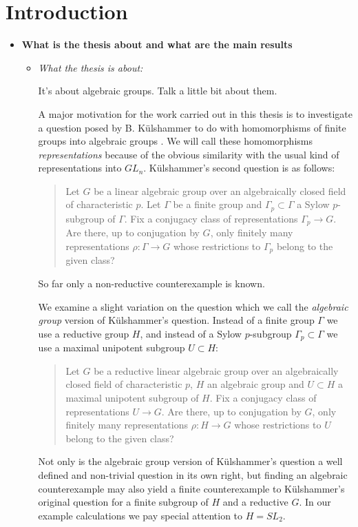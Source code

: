 
\chapter{Introduction}
\label{Chapter1}

\begin{itemize}
	\item[] \textbf{What is the thesis about and what are the main results}
	\begin{itemize}
		\item \emph{What the thesis is about:}
		
		
		It's about algebraic groups. Talk a little bit about them.
		
		A major motivation for the work carried out in this thesis is to investigate a question posed by B. K\"ulshammer to do with homomorphisms of finite groups into algebraic groups \cite{weil1964remarks}. We will call these homomorphisms \emph{representations} because of the obvious similarity with the usual kind of representations into $GL_n$. K\"ulshammer's second question is as follows:
		\begin{quote}
		Let $G$ be a linear algebraic group over an algebraically closed field of characteristic $p$. Let $\Gamma$ be a finite group and $\Gamma_p\subset\Gamma$ a Sylow $p$-subgroup of $\Gamma$. Fix a conjugacy class of representations $\Gamma_p\rightarrow G$. Are there, up to conjugation by $G$, only finitely many representations $\rho:\Gamma\rightarrow G$ whose restrictions to $\Gamma_p$ belong to the given class?
		\end{quote}
		
		
		So far only a non-reductive counterexample\cite{weil1964remarks} is known. 
		
		
		We examine a slight variation on the question which we call the \emph{algebraic group} version of K\"ulshammer's question. Instead of a finite group $\Gamma$ we use a reductive group $H$, and instead of a Sylow $p$-subgroup $\Gamma_p \subset \Gamma$ we use a maximal unipotent subgroup $U \subset H$:
		\begin{quote}
			Let $G$ be a reductive linear algebraic group over an algebraically closed field of characteristic $p$, $H$ an algebraic group and $U \subset H$ a maximal unipotent subgroup of $H$. Fix a conjugacy class of representations $U\rightarrow G$. Are there, up to conjugation by $G$, only finitely many representations $\rho:H\rightarrow G$ whose restrictions to $U$ belong to the given class?
		\end{quote}
		Not only is the algebraic group version of K\"ulshammer's question a well defined and non-trivial question in its own right, but finding an algebraic counterexample may also yield a finite counterexample to K\"ulshammer's original question for a finite subgroup of $H$ and a reductive $G$. In our example calculations we pay special attention to $H = SL_2$.
		

\end{itemize}
\end{itemize}
